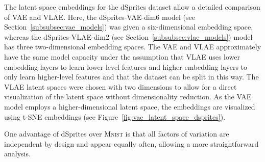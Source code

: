 The latent space embeddings for the dSprites dataset allow a detailed comparison of \ac{VAE} and \ac{VLAE}.
Here, the dSprites-\ac{VAE}-dim6 model (see Section~\ref{subsubsec:vae_models}) was given a six-dimensional embedding space, whereas the dSprites-\ac{VLAE}-dim2 (see Section~\ref{subsubsec:vlae_models}) model has three two-dimensional embedding spaces.
The \ac{VAE} and \ac{VLAE} approximately have the same model capacity under the assumption that \ac{VLAE} uses lower embedding layers to learn lower-level features and higher embedding layers to only learn higher-level features and that the dataset can be split in this way.
The \ac{VLAE} latent spaces were chosen with two dimensions to allow for a direct visualization of the latent space without dimensionality reduction.
As the \ac{VAE} model employs a higher-dimensional latent space, the embeddings are visualized using \ac{t-SNE} embeddings (see Figure~\ref{fig:vae_latent_space_dsprites}).

One advantage of dSprites over \textsc{Mnist} is that all factors of variation are independent by design and appear equally often, allowing a more straightforward analysis.

